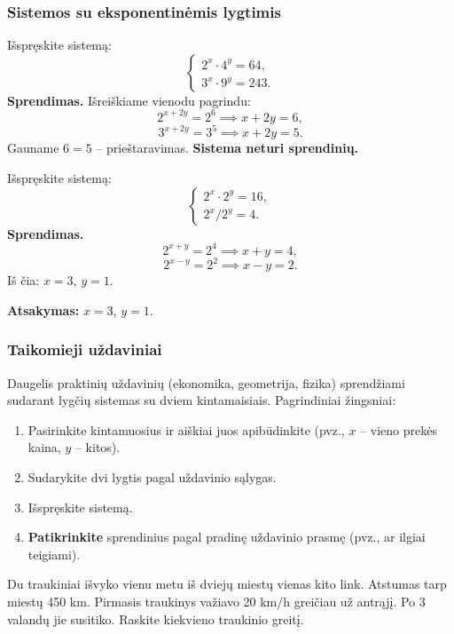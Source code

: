 \subsubsection*{Sistemos su eksponentinėmis lygtimis}

\begin{example}
Išspręskite sistemą:
\[
  \begin{cases}
    2^x \cdot 4^y = 64,\\
    3^x \cdot 9^y = 243.
  \end{cases}
\]
\textbf{Sprendimas.} Išreiškiame vienodu pagrindu:
\[
  2^{x+2y} = 2^6 \implies x + 2y = 6,
\]
\[
  3^{x+2y} = 3^5 \implies x + 2y = 5.
\]
Gauname $6 = 5$ -- prieštaravimas. \textbf{Sistema neturi sprendinių.}
\end{example}

\begin{example}
Išspręskite sistemą:
\[
  \begin{cases}
    2^x \cdot 2^y = 16,\\
    2^x / 2^y = 4.
  \end{cases}
\]
\textbf{Sprendimas.}
\[
  2^{x+y} = 2^4 \implies x + y = 4,
\]
\[
  2^{x-y} = 2^2 \implies x - y = 2.
\]
Iš čia: $x = 3$, $y = 1$.

\textbf{Atsakymas:} $x = 3$, $y = 1$.
\end{example}

\subsubsection*{Taikomieji uždaviniai}

Daugelis praktinių uždavinių (ekonomika, geometrija, fizika) sprendžiami sudarant lygčių sistemas su dviem kintamaisiais. Pagrindiniai žingsniai:

\begin{enumerate}[label=\arabic*.]
  \item Pasirinkite kintamuosius ir aiškiai juos apibūdinkite (pvz., $x$ -- vieno prekės kaina, $y$ -- kitos).
  \item Sudarykite dvi lygtis pagal uždavinio sąlygas.
  \item Išspręskite sistemą.
  \item \textbf{Patikrinkite} sprendinius pagal pradinę uždavinio prasmę (pvz., ar ilgiai teigiami).
\end{enumerate}

\begin{exercise}
Du traukiniai išvyko vienu metu iš dviejų miestų vienas kito link. Atstumas tarp miestų 450 km. Pirmasis traukinys važiavo 20 km/h greičiau už antrąjį. Po 3 valandų jie susitiko. Raskite kiekvieno traukinio greitį.
\end{exercise}

